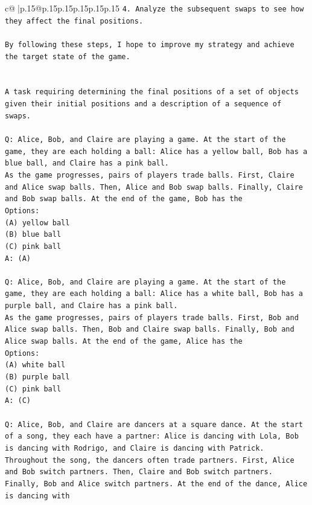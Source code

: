\documentclass{article}
\begin{document}
{\begin{supertabular}{c@{$\;$}|p{.15\linewidth}@{}p{.15\linewidth}p{.15\linewidth}p{.15\linewidth}p{.15\linewidth}p{.15\linewidth}}
{{{\texttt{4. Analyze the subsequent swaps to see how they affect the final positions.} \\
\\ 
\texttt{By following these steps, I hope to improve my strategy and achieve the target state of the game.} \\
\\ 
\\ 
\texttt{A task requiring determining the final positions of a set of objects given their initial positions and a description of a sequence of swaps.} \\
\\ 
\texttt{Q: Alice, Bob, and Claire are playing a game. At the start of the game, they are each holding a ball: Alice has a yellow ball, Bob has a blue ball, and Claire has a pink ball.} \\
\texttt{As the game progresses, pairs of players trade balls. First, Claire and Alice swap balls. Then, Alice and Bob swap balls. Finally, Claire and Bob swap balls. At the end of the game, Bob has the} \\
\texttt{Options:} \\
\texttt{(A) yellow ball} \\
\texttt{(B) blue ball} \\
\texttt{(C) pink ball} \\
\texttt{A: (A)} \\
\\ 
\texttt{Q: Alice, Bob, and Claire are playing a game. At the start of the game, they are each holding a ball: Alice has a white ball, Bob has a purple ball, and Claire has a pink ball.} \\
\texttt{As the game progresses, pairs of players trade balls. First, Bob and Alice swap balls. Then, Bob and Claire swap balls. Finally, Bob and Alice swap balls. At the end of the game, Alice has the} \\
\texttt{Options:} \\
\texttt{(A) white ball} \\
\texttt{(B) purple ball} \\
\texttt{(C) pink ball} \\
\texttt{A: (C)} \\
\\ 
\texttt{Q: Alice, Bob, and Claire are dancers at a square dance. At the start of a song, they each have a partner: Alice is dancing with Lola, Bob is dancing with Rodrigo, and Claire is dancing with Patrick.} \\
\texttt{Throughout the song, the dancers often trade partners. First, Alice and Bob switch partners. Then, Claire and Bob switch partners. Finally, Bob and Alice switch partners. At the end of the dance, Alice is dancing with} \\
}}}
\end{supertabular}}
\end{document}
